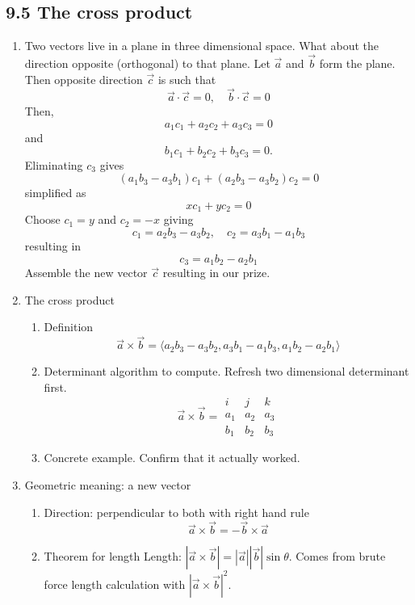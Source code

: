 \documentclass{article}
\begin{document}
\subsection{9.5 The cross product}
\begin{enumerate}

\item Two vectors live in a plane in three dimensional space. What about the direction opposite (orthogonal) to that plane. Let $\vec{a}$ and $\vec{b}$ form the plane. Then opposite direction $\vec{c}$ is such that 
\[
\vec{a} \cdot \vec{c} = 0, \quad \vec{b} \cdot \vec{c} = 0
\]
Then, 
\[
a_1 c_1 + a_2 c_2 + a_3 c_3 = 0
\]
and
\[
b_1 c_1 + b_2 c_2 + b_3 c_3 = 0.
\]
Eliminating $c_3$ gives
\[
(a_1b_3-a_3b_1) c_1 + (a_2b_3-a_3b_2) c_2 = 0
\]
simplified as 
\[
x c_1 + y c_2 = 0
\]
Choose  $c_1=y$ and $c_2=-x$ giving
\[
c_1 = a_2b_3-a_3b_2, \quad c_2 = a_3b_1-a_1b_3
\]
resulting in 
\[
c_3 = a_1b_2-a_2b_1
\]
Assemble the new vector $\vec{c}$ resulting in our prize.

\item The cross product
\begin{enumerate}
\item Definition
$$
\vec a \times \vec b = \langle a_2b_3-a_3b_2, a_3b_1-a_1b_3, a_1b_2-a_2b_1\rangle
$$
\item Determinant algorithm to compute. Refresh two dimensional determinant first.
\[
\vec{a} \times \vec{b} = 
\begin{array}{|rrr|}
i &  j & k \\
a_1 & a_2 & a_3 \\
b_1 &  b_2 & b_3 
\end{array}
\]
\item Concrete example. Confirm that it actually worked.
\end{enumerate}

\item Geometric meaning: a new vector 
\begin{enumerate}
\item Direction: perpendicular to both with right hand rule
$$
\vec a\times\vec b= - \vec b\times\vec a
$$
\item Theorem for length Length: $|\vec a\times\vec b| = |\vec a||\vec b|\sin\theta$. Comes from brute force length calculation with $|\vec a\times\vec b|^2$.


\end{enumerate}
\end{enumerate}
\end{document}
